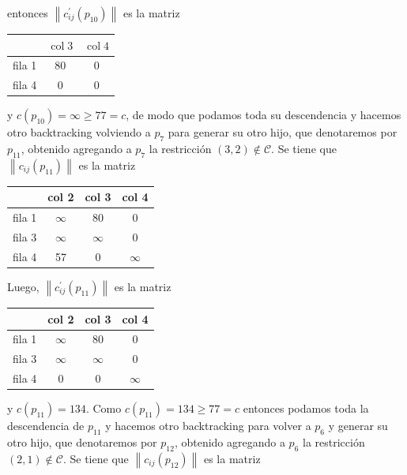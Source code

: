 \documentclass[10pt]{article}
\begin{document}
entonces $\left\|c_{i j}^{\prime}\left(p_{10}\right)\right\|$ es la matriz

\begin{center}
\begin{tabular}{|l|c|c|}
\hline
 & $\operatorname{col} 3$ & $\operatorname{col} 4$ \\
\hline
fila 1 & 80 & 0 \\
\hline
fila 4 & 0 & 0 \\
\hline
\end{tabular}
\end{center}

y $c\left(p_{10}\right)=\infty \geq 77=c$, de modo que podamos toda su descendencia y hacemos otro backtracking volviendo a $p_{7}$ para generar su otro hijo, que denotaremos por $p_{11}$, obtenido agregando a $p_{7}$ la restricción $(3,2) \notin \mathcal{C}$. Se tiene que $\left\|c_{i j}\left(p_{11}\right)\right\|$ es la matriz

\begin{center}
\begin{tabular}{|c|c|c|c|}
\hline
 & col 2 & col 3 & col 4 \\
\hline
fila 1 & $\infty$ & 80 & 0 \\
\hline
fila 3 & $\infty$ & $\infty$ & 0 \\
\hline
fila 4 & 57 & 0 & $\infty$ \\
\hline
\end{tabular}
\end{center}

Luego, $\left\|c_{i j}^{\prime}\left(p_{11}\right)\right\|$ es la matriz

\begin{center}
\begin{tabular}{|l|c|c|c|}
\hline
 & col 2 & col 3 & col 4 \\
\hline
fila 1 & $\infty$ & 80 & 0 \\
\hline
fila 3 & $\infty$ & $\infty$ & 0 \\
\hline
fila 4 & 0 & 0 & $\infty$ \\
\hline
\end{tabular}
\end{center}

y $c\left(p_{11}\right)=134$. Como $c\left(p_{11}\right)=134 \geq 77=c$ entonces podamos toda la descendencia de $p_{11}$ y hacemos otro backtracking para volver a $p_{6}$ y generar su otro hijo, que denotaremos por $p_{12}$, obtenido agregando a $p_{6}$ la restricción $(2,1) \notin \mathcal{C}$. Se tiene que $\left\|c_{i j}\left(p_{12}\right)\right\|$ es la matriz
\end{document}
